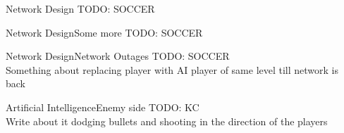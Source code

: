 \documentclass{beamer}
\begin{document}

\begin{frame}{Network Design}{}
	TODO: SOCCER
\end{frame}

\begin{frame}{Network Design}{Some more}
	TODO: SOCCER
\end{frame}

\begin{frame}{Network Design}{Network Outages}
	TODO: SOCCER \\
	Something about replacing player with AI player of same level till network is back

\end{frame}

\begin{frame}{Artificial Intelligence}{Enemy side}
	TODO: KC \\
	Write about it dodging bullets and shooting in the direction of the players
\end{frame}
\end{document}
